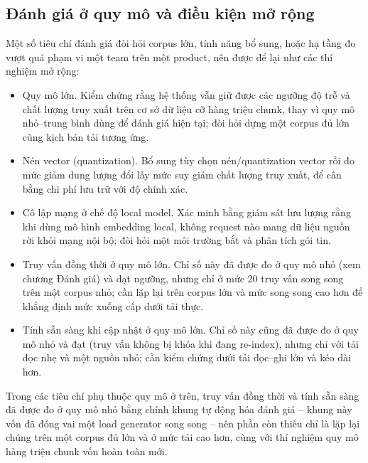 \subsection{Đánh giá ở quy mô và điều kiện mở rộng}

Một số tiêu chí đánh giá đòi hỏi corpus lớn, tính năng bổ sung, hoặc hạ tầng đo vượt quá phạm vi một team trên một product, nên được để lại như các thí nghiệm mở rộng:

\begin{itemize}
  \item Quy mô lớn. Kiểm chứng rằng hệ thống vẫn giữ được các ngưỡng độ trễ và chất lượng truy xuất trên cơ sở dữ liệu cỡ hàng triệu chunk, thay vì quy mô nhỏ--trung bình dùng để đánh giá hiện tại; đòi hỏi dựng một corpus đủ lớn cùng kịch bản tải tương ứng.
  \item Nén vector (quantization). Bổ sung tùy chọn nén/quantization vector rồi đo mức giảm dung lượng đổi lấy mức suy giảm chất lượng truy xuất, để cân bằng chi phí lưu trữ với độ chính xác.
  \item Cô lập mạng ở chế độ local model. Xác minh bằng giám sát lưu lượng rằng khi dùng mô hình embedding local, không request nào mang dữ liệu nguồn rời khỏi mạng nội bộ; đòi hỏi một môi trường bắt và phân tích gói tin.
  \item Truy vấn đồng thời ở quy mô lớn. Chỉ số này đã được đo ở quy mô nhỏ (xem chương Đánh giá) và đạt ngưỡng, nhưng chỉ ở mức $20$ truy vấn song song trên một corpus nhỏ; cần lặp lại trên corpus lớn và mức song song cao hơn để khẳng định mức xuống cấp dưới tải thực.
  \item Tính sẵn sàng khi cập nhật ở quy mô lớn. Chỉ số này cũng đã được đo ở quy mô nhỏ và đạt (truy vấn không bị khóa khi đang re-index), nhưng chỉ với tải đọc nhẹ và một nguồn nhỏ; cần kiểm chứng dưới tải đọc--ghi lớn và kéo dài hơn.
\end{itemize}

Trong các tiêu chí phụ thuộc quy mô ở trên, truy vấn đồng thời và tính sẵn sàng đã được đo ở quy mô nhỏ bằng chính khung tự động hóa đánh giá -- khung này vốn đã đóng vai một load generator song song -- nên phần còn thiếu chỉ là lặp lại chúng trên một corpus đủ lớn và ở mức tải cao hơn, cùng với thí nghiệm quy mô hàng triệu chunk vốn hoàn toàn mới.
